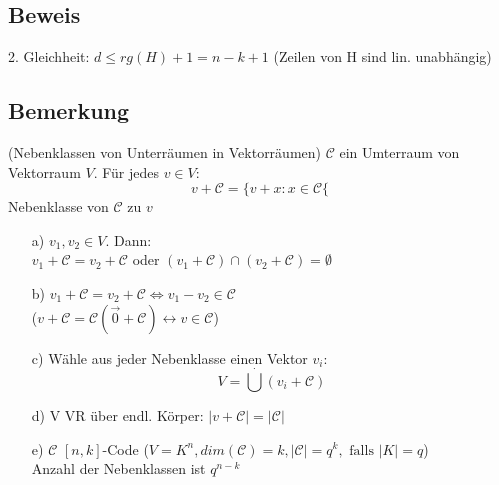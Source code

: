 \subsection{Beweis}
2. Gleichheit: $d \leq rg(H)+1=n-k+1$ (Zeilen von H sind lin. unabh\"angig)
\subsection{Bemerkung}
(Nebenklassen von Unterr\"aumen in Vektorr\"aumen)
$\mathcal{C}$ ein Umterraum von Vektorraum $V$. F\"ur jedes $v \in V$:
\[
	v + \mathcal{C} = \lbrace v+x : x \in \mathcal{C} \lbrace
\]
Nebenklasse von $\mathcal{C}$ zu $v$
\begin{itemize}
	\item[a)] $v_1,v_2 \in V$. Dann: \\
					$v_1 + \mathcal{C} = v_2 + \mathcal{C}$ oder $(v_1 + \mathcal{C}) \cap (v_2 + \mathcal{C}) = \emptyset$
	\item[b)] $v_1 + \mathcal{C} = v_2 + \mathcal{C} \Leftrightarrow v_1-v_2 \in \mathcal{C}$\\
						($v+ \mathcal{C} = \mathcal{C} (\vec{0}+\mathcal{C}) \leftrightarrow v \in \mathcal{C}$)
	\item[c)] W\"ahle aus jeder Nebenklasse einen Vektor $v_i$:\\
	\[
			V=\bigcup^{\cdot} (v_i + \mathcal{C})
	\]
	\item[d)] V VR \"uber endl. K\"orper: $\left| v + \mathcal{C} \right| = \left| \mathcal{C} \right|$
	\item[e)] $\mathcal{C}$ $[n,k]$-Code ($V=K^n, dim(\mathcal{C})=k,\left|\mathcal{C}\right|=q^k, \text{ falls } \left|K\right|=q$) \\
						Anzahl der Nebenklassen ist $q^{n-k}$
\end{itemize}

